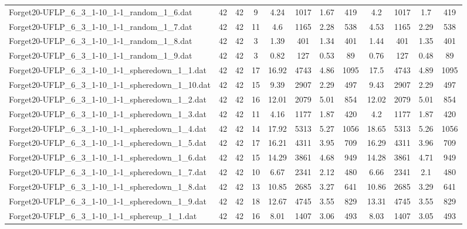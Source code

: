 \begin{sidewaystable}[!ht]
{\begin{tabular}{lccccccccccc}
Forget20-UFLP\_6\_3\_1-10\_1-1\_random\_1\_6.dat & 42 & 42 & 9 & 4.24 & 1017 &  \textcolor{blue2}{1.67} & 419 & 4.2 & 1017 & 1.7 & 419 \\
Forget20-UFLP\_6\_3\_1-10\_1-1\_random\_1\_7.dat & 42 & 42 & 11 & 4.6 & 1165 & 2.28 & 538 & 4.53 & 1165 & 2.29 & 538 \\
Forget20-UFLP\_6\_3\_1-10\_1-1\_random\_1\_8.dat & 42 & 42 & 3 & 1.39 & 401 &  \textcolor{blue2}{1.34} & 401 & 1.44 & 401 & 1.35 & 401 \\
Forget20-UFLP\_6\_3\_1-10\_1-1\_random\_1\_9.dat & 42 & 42 & 3 & 0.82 & 127 & 0.53 & 89 & 0.76 & 127 &  \textcolor{blue2}{0.48} & 89 \\
Forget20-UFLP\_6\_3\_1-10\_1-1\_spheredown\_1\_1.dat & 42 & 42 & 17 & 16.92 & 4743 &  \textcolor{blue2}{4.86} & 1095 & 17.5 & 4743 & 4.89 & 1095 \\
Forget20-UFLP\_6\_3\_1-10\_1-1\_spheredown\_1\_10.dat & 42 & 42 & 15 & 9.39 & 2907 & 2.29 & 497 & 9.43 & 2907 & 2.29 & 497 \\
Forget20-UFLP\_6\_3\_1-10\_1-1\_spheredown\_1\_2.dat & 42 & 42 & 16 & 12.01 & 2079 & 5.01 & 854 & 12.02 & 2079 & 5.01 & 854 \\
Forget20-UFLP\_6\_3\_1-10\_1-1\_spheredown\_1\_3.dat & 42 & 42 & 11 & 4.16 & 1177 &  \textcolor{blue2}{1.87} & 420 & 4.2 & 1177 &  \textcolor{blue2}{1.87} & 420 \\
Forget20-UFLP\_6\_3\_1-10\_1-1\_spheredown\_1\_4.dat & 42 & 42 & 14 & 17.92 & 5313 & 5.27 & 1056 & 18.65 & 5313 &  \textcolor{blue2}{5.26} & 1056 \\
Forget20-UFLP\_6\_3\_1-10\_1-1\_spheredown\_1\_5.dat & 42 & 42 & 17 & 16.21 & 4311 &  \textcolor{blue2}{3.95} & 709 & 16.29 & 4311 & 3.96 & 709 \\
Forget20-UFLP\_6\_3\_1-10\_1-1\_spheredown\_1\_6.dat & 42 & 42 & 15 & 14.29 & 3861 &  \textcolor{blue2}{4.68} & 949 & 14.28 & 3861 & 4.71 & 949 \\
Forget20-UFLP\_6\_3\_1-10\_1-1\_spheredown\_1\_7.dat & 42 & 42 & 10 & 6.67 & 2341 & 2.12 & 480 & 6.66 & 2341 &  \textcolor{blue2}{2.1} & 480 \\
Forget20-UFLP\_6\_3\_1-10\_1-1\_spheredown\_1\_8.dat & 42 & 42 & 13 & 10.85 & 2685 &  \textcolor{blue2}{3.27} & 641 & 10.86 & 2685 & 3.29 & 641 \\
Forget20-UFLP\_6\_3\_1-10\_1-1\_spheredown\_1\_9.dat & 42 & 42 & 18 & 12.67 & 4745 & 3.55 & 829 & 13.31 & 4745 & 3.55 & 829 \\
Forget20-UFLP\_6\_3\_1-10\_1-1\_sphereup\_1\_1.dat & 42 & 42 & 16 & 8.01 & 1407 & 3.06 & 493 & 8.03 & 1407 &  \textcolor{blue2}{3.05} & 493 \\

\end{tabular}}
\end{sidewaystable}
